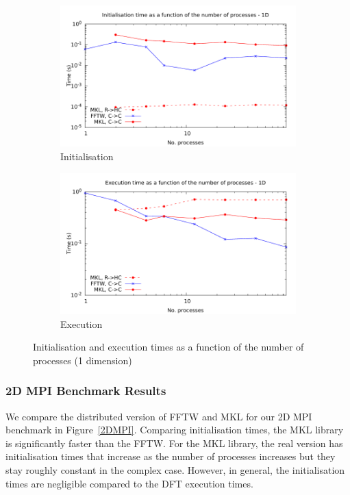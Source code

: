 \documentclass[12pt, a4paper]{article} \setlength{\textheight}{24cm}
\begin{document}
\begin{figure}[H]
  \centering
  \begin{subfigure}{.5\textwidth}
    \centering
    \includegraphics[width=.9\linewidth]{graphs/mpi-init-1d.pdf}
    \caption{Initialisation}
    \label{1DMPII}
  \end{subfigure}%
  \begin{subfigure}{.5\textwidth}
    \centering
    \includegraphics[width=.9\linewidth]{graphs/mpi-exec-1d.pdf}
    \caption{Execution}
    \label{1DMPIE}
  \end{subfigure}
  \caption{Initialisation and execution times as a function of the
    number of processes (1 dimension)}
  \label{1DMPI}
\end{figure}


\subsubsection{2D MPI Benchmark Results}
We compare the distributed version of FFTW and MKL for our 2D MPI
benchmark in Figure~\ref{2DMPI}. Comparing initialisation times, the
MKL library is significantly faster than the FFTW. For the MKL
library, the real version has initialisation times that increase as
the number of processes increases but they stay roughly constant in
the complex case. However, in general, the initialisation times are
negligible compared to the DFT execution times.
\end{document}
